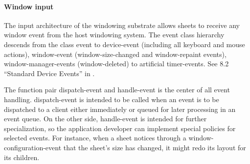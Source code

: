 \documentclass[twocolumn,a4paper]{article}
\newcommand {\concept} [1] {{\sl #1}\index{#1}}
\newcommand {\code}[1]{{\sffamily #1}}
\newcommand {\CLIM}{\textsc{clim}}
\begin{document}
\paragraph*{Window input} The input architecture of the windowing
substrate allows sheets to receive any window event from the host
windowing system. The event class hierarchy descends from the class
\code{event} to \code{device-event} (including all keyboard and mouse
actions), \code{window-event} (window-size-changed and window-repaint
events), \code{window-manager-events} (window-deleted) to artificial
\code{timer-events}. See 8.2 ``Standard Device Events'' in
\cite{clim-spec}.

The function pair \code{dispatch-event} and \code{handle-event} is the
center of all event handling. \code{dispatch-event} is intended to be
called when an event is to be dispatched to a client either
immediately or queued for later processing in an event queue. On the
other side, \code{handle-event} is intended for further
specialization, so the application developer can implement special
policies for selected events. For instance, when a sheet notices
through a \code{window-configuration-event} that the sheet's size
has changed, it might redo its layout for its children.


\end{document}
